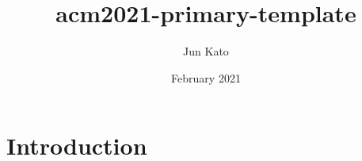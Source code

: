 \documentclass{article}
\title{acm2021-primary-template}
\author{Jun Kato}
\date{February 2021}
\begin{document}
\maketitle

\section{Introduction}
\end{document}
